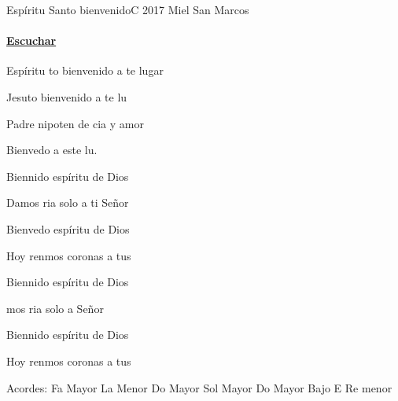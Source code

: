 \documentclass[12pt, spanish]{book}
\newcommand{\NotCCLIed}{\relax}
\begin{document}
    \begin{song}{Espíritu Santo bienvenido}{C}
        {2017} %
        {Miel San Marcos}
        {} %
        {} %
        \ifChordBk
        \paragraph{\mbox{}\hfill\protect\href{https://open.spotify.com/intl-es/track/1MmoKXTAgWWvRS1MXt53dU}{Escuchar}\mbox{}\hfill}
        \fi


        \begin{SBOpGroup}
            Espíritu to bienvenido a te lugar

            Jesuto bienvenido a te lu

            Padre nipoten de cia y amor

            Bienvedo a este lu.
        \end{SBOpGroup}

        \begin{SBChorus}
            Biennido espíritu de Dios

            Damos ria solo a ti Señor

            Bienvedo espíritu de Dios

            Hoy renmos coronas a tus 
        \end{SBChorus}

        \begin{SBOpGroup}
            Biennido espíritu de Dios

            mos ria solo a  Señor

            Biennido espíritu de Dios

            Hoy renmos coronas a tus 
        \end{SBOpGroup}

        \ifChordBk
        \begin{SBOpGroup}
            Acordes:
            \upchord{\F}\qquad Fa Mayor \hfill
            \upchord{\Am}\qquad La Menor \hfill\null\break
            \upchord{\C}\qquad Do Mayor \hfill
            \upchord{\G}\qquad Sol Mayor \hfill\null\break
            \upchord{\CE}\qquad Do Mayor Bajo E  \hfill
            \upchord{\Dm}\qquad Re menor  \hfill\null\break
        \end{SBOpGroup}
        \fi
    \end{song}
\end{document}
